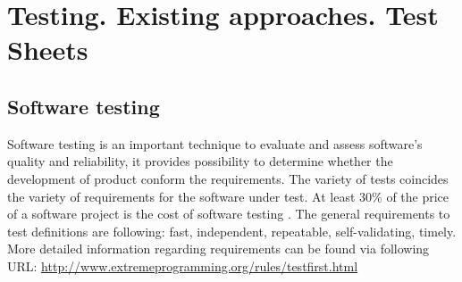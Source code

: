 \chapter{Testing. Existing approaches. Test Sheets}
\label{chap:testing}
\section{Software testing}
\label{sec:testing}
Software testing is an important technique to evaluate and assess software's quality and reliability, it provides possibility to determine whether the development of product conform the requirements. The variety of tests coincides the variety of requirements for the software under test. At least 30\% of the price of a software project is the cost of software testing \cite{Lecture2}. 
The general requirements to test definitions are following: fast, independent, repeatable, self-validating, timely.
More detailed information regarding requirements can be found via following URL: \url{http://www.extremeprogramming.org/rules/testfirst.html}
